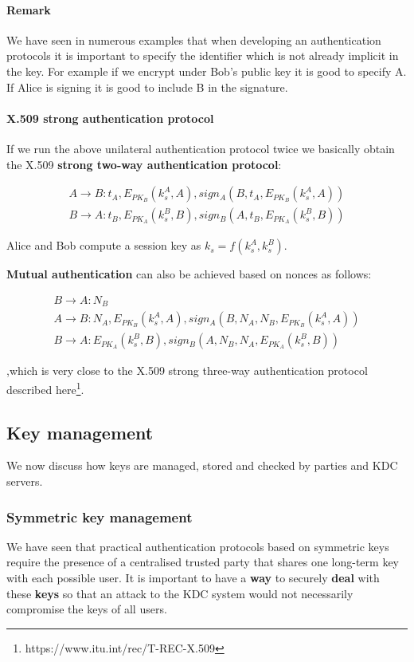 \paragraph{Remark} We have seen in numerous examples that when developing an authentication protocols it is important to specify the identifier which is not already implicit in the key. For example if we encrypt under Bob’s public key it is good to specify A. If Alice is signing it is good to include B in the signature.

\paragraph{X.509 strong authentication protocol} If we run the above unilateral authentication protocol twice we basically obtain the X.509 \textbf{strong two-way authentication protocol}:

$$\begin{array}{l} A \rightarrow B: t_A, E_{PK_B}(k^A_s,A), sign_{A}( B, t_A, E_{PK_B}(k^A_s,A)) \\ B \rightarrow A: t_B, E_{PK_A}(k^B_s,B), sign_{B}( A, t_B, E_{PK_A}(k^B_s,B))\end{array} $$

Alice and Bob compute a session key as $k_s = f(k^A_s,k^B_s)$.

\textbf{Mutual authentication} can also be achieved based on nonces as follows:

$$\begin{array}{l} B \rightarrow A: N_B \\ A \rightarrow B: N_A, E_{PK_B}(k^A_s,A), sign_{A}( B, N_A, N_B, E_{PK_B}(k^A_s,A)) \\ B \rightarrow A: E_{PK_A}(k^B_s,B), sign_{B}( A, N_B, N_A, E_{PK_A}(k^B_s,B))\end{array}$$ 

,which is very close to the X.509 strong three-way authentication protocol described here\footnote{https://www.itu.int/rec/T-REC-X.509}.

\subsection{Key management}
We now discuss how keys are managed, stored and checked by parties and KDC servers.

\subsubsection{Symmetric key management}
We have seen that practical authentication protocols based on symmetric keys require the presence of a centralised trusted party that shares one long-term key with each possible user. It is important to have a \textbf{way} to securely \textbf{deal} with these \textbf{keys} so that an attack to the KDC system would not necessarily compromise the keys of all users.

